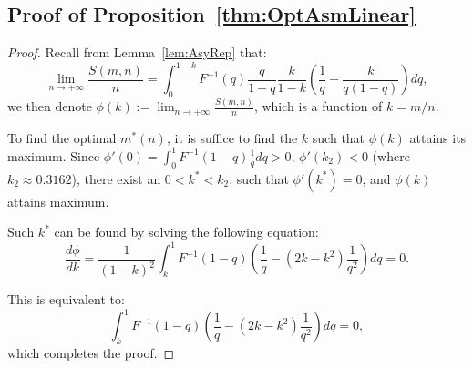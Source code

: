 \subsection*{Proof of Proposition~\ref{thm:OptAsmLinear}}
\begin{proof}
    Recall from Lemma~\ref{lem:AsyRep} that: 
    $$\lim_{n\rightarrow +\infty}\frac{S(m,n)}{n}=\int_0^{1-k}F^{-1}(q)\frac{q}{1-q}\frac{k}{1-k}(\frac{1}{q}-\frac{k}{q(1-q)})dq,$$
    we then denote $\phi(k):=\lim_{n\rightarrow +\infty}\frac{S(m,n)}{n}$, which is a function of $k=m/n$.

To find the optimal $m^*(n)$, it is suffice to find the $k$ such that $\phi(k)$ attains its maximum. Since $\phi'(0)=\int_0^1F^{-1}(1-q)\frac{1}{q}dq>0$, $\phi'(k_2)<0$ (where $k_2 \approx 0.3162$),  there exist an $0<k^*<k_2$, such that $\phi'(k^*)=0$, and $\phi(k)$ attains maximum. 

Such $k^*$ can be found by solving the following equation:
$$\frac{d \phi}{dk}=\frac{1}{(1-k)^2}\int_k^1 F^{-1}(1-q)(\frac{1}{q}-(2k-k^2)\frac{1}{q^2})dq=0.$$

This is equivalent to:
$$\int_k^1 F^{-1}(1-q)(\frac{1}{q}-(2k-k^2)\frac{1}{q^2})dq=0,$$
which completes the proof. 
\end{proof}


